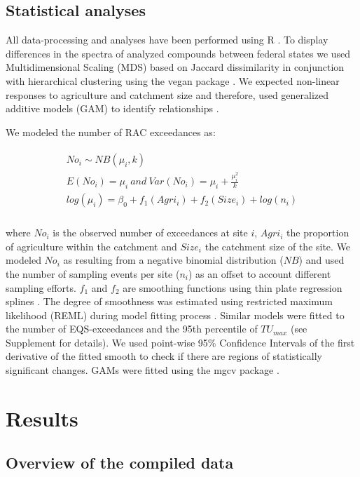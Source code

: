 \documentclass[journal=esthag,manuscript=article]{achemso}
\begin{document}
\subsection{Statistical analyses}

All data-processing and analyses have been performed using R \citep{r_core_team_r:_2016}.
To display differences in the spectra of analyzed compounds between federal states we used Multidimensional Scaling (MDS) based on Jaccard dissimilarity in conjunction with hierarchical clustering using the vegan package \citep{oksanen_vegan:_2016}.
We expected non-linear responses to agriculture and catchment size and therefore, used generalized additive models (GAM) to identify relationships \citep{fewster_analysis_2000}.

We modeled the number of RAC exceedances as:

\begin{align}
\begin{split}
  No_i \sim NB(\mu_i, k) \\
  E(No_i) = \mu_i~and~Var(No_i) = \mu_i + \frac{\mu_i^2}{k} \\
  log(\mu_i)= \beta_0 + f_1(Agri_i) + f_2(Size_i) + log(n_i) \\
\end{split}
\end{align}

where $No_i$ is the observed number of exceedances at site $i$, $Agri_i$ the proportion of agriculture within the catchment and $Size_i$ the catchment size of the site. 
We modeled $No_i$ as resulting from a negative binomial distribution ($NB$) and used the number of sampling events per site ($n_i$) as an offset to account different sampling efforts. 
$f_1$ and $f_2$ are smoothing functions using thin plate regression splines \citep{wood_thin_2003}.
The degree of smoothness was estimated using restricted maximum likelihood (REML) during model fitting process \citep{wood_fast_2011}.
Similar models were fitted to the number of EQS-exceedances and the 95th percentile of $TU_{max}$ (see Supplement for details). 
We used point-wise 95\% Confidence Intervals of the first derivative of the fitted smooth to check if there are regions of statistically significant changes.
GAMs were fitted using the mgcv package \citep{wood_fast_2011}.


\section{Results}
\subsection{Overview of the compiled data}
\end{document}
